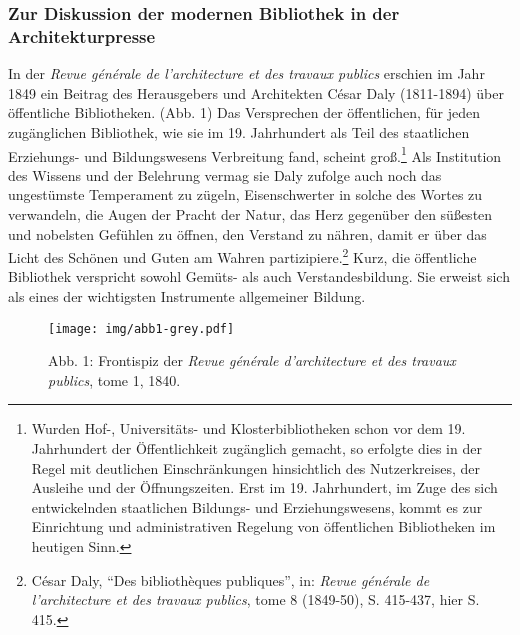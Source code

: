 \subsubsection{Zur Diskussion der modernen Bibliothek in der
Architekturpresse}\label{zur-diskussion-der-modernen-bibliothek-in-der-architekturpresse}

In der \emph{Revue générale de l'architecture et des travaux publics}
erschien im Jahr 1849 ein Beitrag des Herausgebers und Architekten César
Daly (1811-1894) über öffentliche Bibliotheken. (Abb. 1) Das Versprechen
der öffentlichen, für jeden zugänglichen Bibliothek, wie sie im 19.
Jahrhundert als Teil des staatlichen Erziehungs- und Bildungswesens
Verbreitung fand, scheint groß.\footnote{Wurden Hof-, Universitäts- und
  Klosterbibliotheken schon vor dem 19. Jahrhundert der Öffentlichkeit
  zugänglich gemacht, so erfolgte dies in der Regel mit deutlichen
  Einschränkungen hinsichtlich des Nutzerkreises, der Ausleihe und der
  Öffnungszeiten. Erst im 19. Jahrhundert, im Zuge des sich
  entwickelnden staatlichen Bildungs- und Erziehungswesens, kommt es zur
  Einrichtung und administrativen Regelung von öffentlichen Bibliotheken
  im heutigen Sinn.} Als Institution des Wissens und der Belehrung
vermag sie Daly zufolge auch noch das ungestümste Temperament zu zügeln,
Eisenschwerter in solche des Wortes zu verwandeln, die Augen der Pracht
der Natur, das Herz gegenüber den süßesten und nobelsten Gefühlen zu
öffnen, den Verstand zu nähren, damit er über das Licht des Schönen und
Guten am Wahren partizipiere.\footnote{César Daly, \enquote{Des
  bibliothèques publiques}, in: \emph{Revue générale de l'architecture
  et des travaux publics}, tome 8 (1849-50), S. 415-437, hier S. 415.}
Kurz, die öffentliche Bibliothek verspricht sowohl Gemüts- als auch
Verstandesbildung. Sie erweist sich als eines der wichtigsten
Instrumente allgemeiner Bildung.

\begin{figure}[htbp]
\centering
\texttt{[image: img/abb1-grey.pdf]}
\caption*{Abb. 1: Frontispiz der \emph{Revue générale d'architecture et
des travaux publics}, tome 1, 1840.}
\end{figure}

